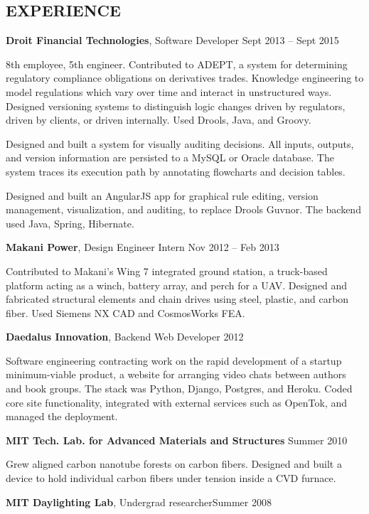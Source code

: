 \documentclass[margin]{res}
\begin{document}
\begin{resume}
	\section{EXPERIENCE}%

		{\bf Droit Financial Technologies}, Software Developer \hfill Sept 2013 -- Sept 2015
		
		8th employee, 5th engineer. Contributed to ADEPT, a system for determining regulatory compliance obligations on derivatives trades. Knowledge engineering to model regulations which vary over time and interact in unstructured ways. Designed versioning systems to distinguish logic changes driven by regulators, driven by clients, or driven internally. Used Drools, Java, and Groovy.

		Designed and built a system for visually auditing decisions. All inputs, outputs, and version information are persisted to a MySQL or Oracle database. The system traces its execution path by annotating flowcharts and decision tables.

		Designed and built an AngularJS app for graphical rule editing, version management, visualization, and auditing, to replace Drools Guvnor. The backend used Java, Spring, Hibernate.
	

		{\bf Makani Power}, Design Engineer Intern \hfill Nov 2012 -- Feb 2013

		Contributed to Makani's Wing 7 integrated ground station, a truck-based platform acting as a winch, battery array, and perch for a UAV. Designed and fabricated structural elements and chain drives using steel, plastic, and carbon fiber. Used Siemens NX CAD and CosmosWorks FEA.


		{\bf Daedalus Innovation}, Backend Web Developer \hfill 2012

		Software engineering contracting work on the rapid development of a startup minimum-viable product, a website for arranging video chats between authors and book groups. The stack was Python, Django, Postgres, and Heroku. Coded core site functionality, integrated with external services such as OpenTok, and managed the deployment. 


		{\bf MIT Tech. Lab. for Advanced Materials and Structures}  \hfill Summer 2010

		Grew aligned carbon nanotube forests on carbon fibers. Designed and built a device to hold individual carbon fibers under tension inside a CVD furnace.


		{\bf MIT Daylighting Lab}, Undergrad researcher\hfill Summer 2008


\end{resume}
\end{document}
